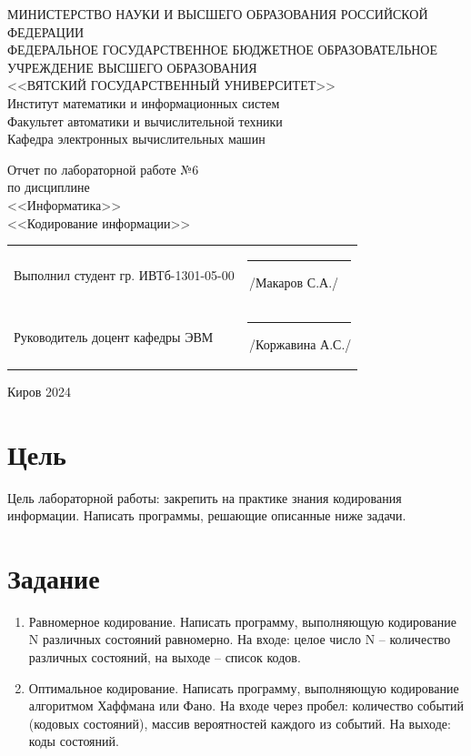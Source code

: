 \documentclass[a4paper,14pt]{extarticle}
\begin{document}
  \newpage\thispagestyle{empty}
  \begin{center}
    \MakeUppercase{
      Министерство науки и высшего образования Российской Федерации\\
      Федеральное государственное бюджетное образовательное учреждение высшего образования\\
      <<Вятский Государственный Университет>>\\
    }
    Институт математики и информационных систем\\
    Факультет автоматики и вычислительной техники\\
    Кафедра электронных вычислительных машин
  \end{center}
  \vfill

  \begin{center}
    Отчет по лабораторной работе №6\\
    по дисциплине\\
    <<Информатика>>\\
    <<Кодирование информации>>
  \end{center}
  \vfill

  \noindent
  \begin{tabular}{ll}
    Выполнил студент гр. ИВТб-1301-05-00 \hspace{5mm} &
    \rule[-1mm]{25mm}{0.10mm}\,/Макаров С.А./\\
    
    Руководитель доцент кафедры ЭВМ & \rule[-1mm]{25mm}{0.10mm}\,/Коржавина А.С./\\
  \end{tabular}

  \vfill
  \begin{center}
    Киров 2024
  \end{center}

  \newpage
  \section*{Цель}
  Цель лабораторной работы: закрепить на практике знания кодирования информации. Написать программы, решающие описанные ниже задачи.

  \section*{Задание}
  \begin{enumerate}
    \item Равномерное кодирование. Написать программу, выполняющую кодирование N различных состояний равномерно. На входе: целое число N -- количество различных состояний, на выходе -- список кодов.
    
    \item Оптимальное кодирование. Написать программу, выполняющую кодирование алгоритмом Хаффмана или Фано. На входе через пробел: количество событий (кодовых состояний), массив вероятностей каждого из событий. На выходе: коды состояний.
  \end{enumerate}
\end{document}
